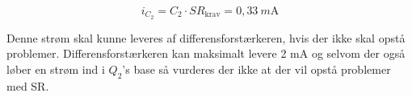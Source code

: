 \begin{equation}
\label{equ:icmin}
i_{C_2} = C_2 \cdot SR_\mathrm{krav} = 0,33~m\mathrm{A}
\end{equation}

Denne strøm skal kunne leveres af differensforstærkeren, hvis der ikke skal opstå problemer. Differensforstærkeren kan maksimalt levere 2 mA og selvom der også løber en strøm ind i $Q_2$'s base så vurderes der ikke at der vil opstå problemer med SR.